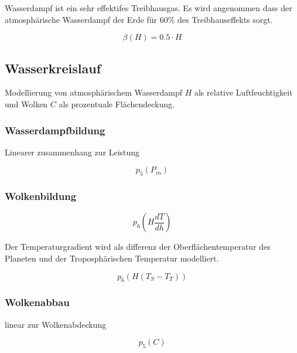 \begin{refsection}
Wasserdampf ist ein sehr effektifes Treibhausgas. Es wird angenommen dass der atmosphärische Wasserdampf der Erde für 60\% des Treibhauseffekts sorgt.  




\begin{equation}
\beta(H) = 0.5 \cdot H
\end{equation}


\subsection{Wasserkreislauf}

Modellierung von atmosphärischem Wasserdampf $H$ als relative Luftfeuchtigkeit und Wolken $C$ als prozentuale Flächendeckung.


\subsubsection{Wasserdampfbildung}

Linearer zusammenhang zur Leistung

\begin{equation}
p_5 (P_{in})
\end{equation}

\subsubsection{Wolkenbildung}

\begin{equation}
p_6 \left( H \frac{dT}{dh} \right)
\end{equation}

Der Temperaturgradient wird als differenz der Oberflächentemperatur des Planeten und der Troposphärischen Temperatur modelliert. 

\begin{equation}
p_6 \left( H(T_S - T_T) \right)
\end{equation}

\subsubsection{Wolkenabbau}

linear zur Wolkenabdeckung

\begin{equation}
p_5 (C)
\end{equation}



\end{refsection}
